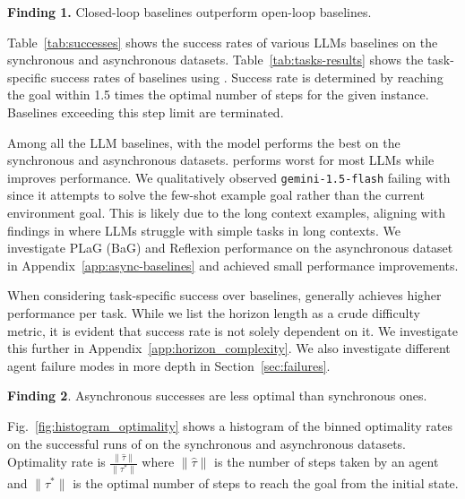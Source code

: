 \textbf{Finding 1.} Closed-loop baselines outperform open-loop baselines.

Table~\ref{tab:successes} shows the success rates of various LLMs baselines on the synchronous and asynchronous datasets. Table~\ref{tab:tasks-results} shows the task-specific success rates of baselines using \gptfo{}. Success rate is determined by reaching the goal within 1.5 times the optimal number of steps for the given instance. Baselines exceeding this step limit are terminated.

Among all the LLM baselines, \react{} with the \gptfo{} model performs the best on the synchronous and asynchronous datasets. \io{} performs worst for most LLMs while \iocot{} improves performance. We qualitatively observed \texttt{gemini-1.5-flash} failing with \react{} since it attempts to solve the few-shot example goal rather than the current environment goal. This is likely due to the long context examples, aligning with findings in \cite{liu2023lostmiddlelanguagemodels} where LLMs struggle with simple tasks in long contexts. We investigate PLaG (BaG) \cite{lin2024graphenhancedlargelanguagemodels} and Reflexion \cite{shinn2023reflexionlanguageagentsverbal} performance on the asynchronous dataset in Appendix~\ref{app:async-baselines} and achieved small performance improvements.

When considering task-specific success over \gptfo{} baselines, \react{} generally achieves higher performance per task. While we list the horizon length as a crude difficulty metric, it is evident that success rate is not solely dependent on it. We investigate this further in Appendix~\ref{app:horizon_complexity}. We also investigate different agent failure modes in more depth in Section~\ref{sec:failures}.




\textbf{Finding 2}. Asynchronous successes are less optimal than synchronous ones.

Fig.~\ref{fig:histogram_optimality} shows a histogram of the binned optimality rates on the successful runs of \gptfo{} \react{} on the synchronous and asynchronous datasets. Optimality rate is $\frac{\|\hat\tau\|}{\|\tau^*\|}$ where $\|\hat\tau\|$ is the number of steps taken by an agent and $\|\tau^*\|$ is the optimal number of steps to reach the goal from the initial state.

